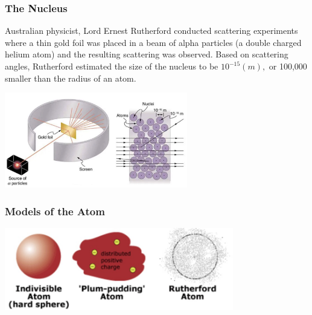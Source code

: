 \documentclass{beamer}
\begin{document}
\begin{frame}\frametitle{The Nucleus}
Australian physicist, Lord Ernest Rutherford conducted scattering experiments where a thin gold foil was placed in a beam of alpha particles (a double charged helium atom) and the resulting scattering was observed. Based on scattering angles, Rutherford estimated the size of the nucleus to be $10^{-15} (m),$ or 100,000 smaller than the radius of an atom.
\begin{center}
\includegraphics[width=8cm]{fig/nucleus.jpg}
\end{center}
\end{frame}

\begin{frame}\frametitle{Models of the Atom}
\begin{center}
\includegraphics[width=10cm]{fig/atom1.jpg}
\end{center}
\end{frame}
\end{document}
